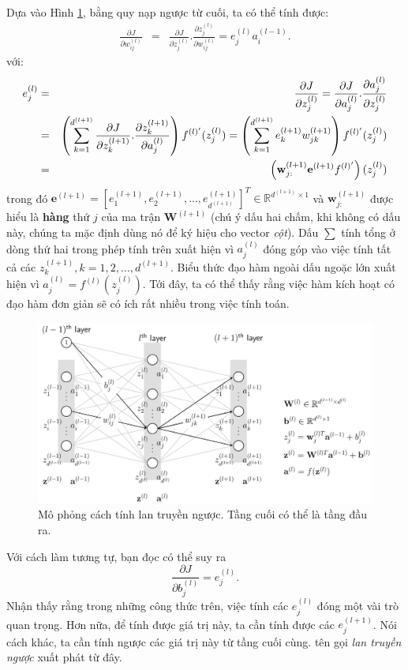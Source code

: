Dựa vào Hình \ref{fig:14_6_2}, bằng quy nạp ngược từ cuối, ta có thể tính được:
\begin{eqnarray}
\frac{\partial J}{\partial w_{ij}^{(l)}} &=& \frac{\partial J}{\partial
z_j^{(l)}}. \frac{\partial z_j^{(l)}}{\partial w_{ij}^{(l)}} = e_j^{(l)} a_i^{(l-1)}.
\end{eqnarray}
\newpage
với:
\begin{eqnarray*}
e_j^{(l)} &=& \frac{\partial J}{\partial z_j^{(l)}} = \frac{\partial J}{\partial a_j^{(l)}} . \frac{\partial a_j^{(l)}}{\partial z_j^{(l)}} \\\
&=& \left( \sum_{k = 1}^{d^{(l+1)}} \frac{\partial J}{\partial z_k^{(l+1)}}
.\frac{\partial z_k^{(l+1)}}{\partial a_j^{(l)}} \right) f^{(l)'}(z_j^{(l)}) =\left( \sum_{k = 1}^{d^{(l+1)}} e_k^{(l+1)} w_{jk}^{(l+1)} \right)
f^{(l)'}(z_j^{(l)}) \\
&=& \left(\mathbf{w}_{j:}^{(l+1)}\mathbf{e}^{(l+1)}f^{(l)'}\right)(z_j^{(l)})
\end{eqnarray*}
trong đó $\mathbf{e}^{(l+1)} = [e_1^{(l+1)}, e_2^{(l+1)}, ...,
e_{d^{(l+1)}}^{(l+1)}]^T \in \mathbb{R}^{d^{(l+1)}\times 1} $ và
$\mathbf{w}_{j:}^{(l+1)}$ được hiểu là \textbf{hàng} thứ $j$ của ma trận
$\mathbf{W}^{(l+1)}$ (chú ý dấu hai chấm, khi không có dấu này, chúng ta mặc
định dùng nó để ký hiệu cho vector \textit{cột}).
Dấu $\sum$ tính tổng ở dòng thứ hai trong phép tính trên xuất hiện vì
$a_{j}^{(l)}$ {đóng góp} vào việc tính tất cả các $z_k^{(l+1)}, k = 1, 2,
\dots, d^{(l+1)}$. Biểu thức đạo hàm ngoài dấu ngoặc lớn xuất hiện vì $a_j^{(l)}  =
f^{(l)}(z_j^{(l)})$. Tới đây, ta có thể thấy rằng việc hàm kích hoạt có
đạo hàm đơn giản sẽ có ích rất nhiều trong việc tính toán.
\begin{figure}[t]
\centering
\includegraphics[width =
.95\textwidth]{Chapters/05_NeuralNetworks/14_mlp/latex/backpropagation.pdf}
\caption[]{Mô phỏng cách tính lan truyền ngược. Tầng cuối có thể là tầng đầu ra.}
\label{fig:14_6_2}
\end{figure}
Với cách làm tương tự, bạn đọc có thể suy ra
\begin{equation}
\frac{\partial J}{\partial b_j^{(l)}} = e_j^{(l)}.
\end{equation}
Nhận thấy rằng trong những công thức trên, việc tính các $e_j^{(l)}$ đóng một vài trò quan trọng. Hơn nữa, để tính được giá trị này, ta cần tính được các $e_j^{(l+1)}$. Nói cách khác, ta cần tính {ngược} các giá trị này từ tầng cuối cùng. tên gọi \textit{lan truyền ngược} xuất phát từ đây.

